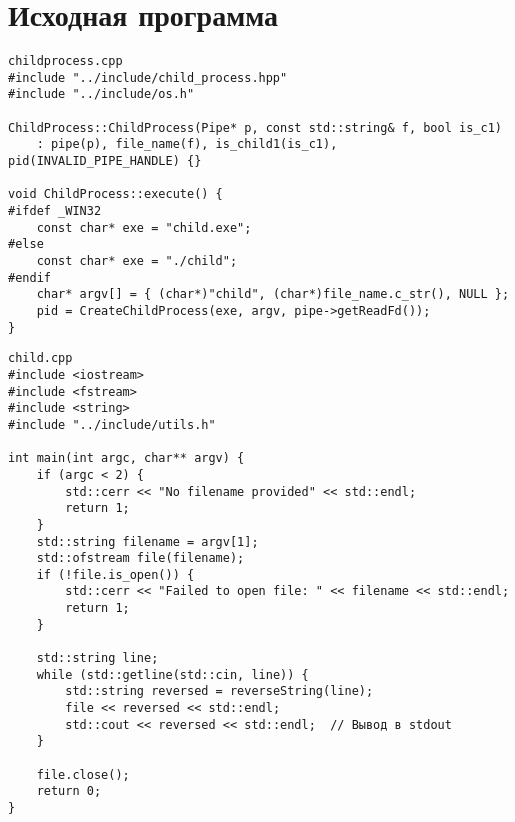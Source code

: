 \section{Исходная программа}

\begin{verbatim}
childprocess.cpp
#include "../include/child_process.hpp"
#include "../include/os.h"

ChildProcess::ChildProcess(Pipe* p, const std::string& f, bool is_c1) 
    : pipe(p), file_name(f), is_child1(is_c1), pid(INVALID_PIPE_HANDLE) {}

void ChildProcess::execute() {
#ifdef _WIN32
    const char* exe = "child.exe";
#else
    const char* exe = "./child";
#endif
    char* argv[] = { (char*)"child", (char*)file_name.c_str(), NULL };
    pid = CreateChildProcess(exe, argv, pipe->getReadFd());
}
\end{verbatim}

\begin{verbatim}
child.cpp
#include <iostream>
#include <fstream>
#include <string>
#include "../include/utils.h"

int main(int argc, char** argv) {
    if (argc < 2) {
        std::cerr << "No filename provided" << std::endl;
        return 1;
    }
    std::string filename = argv[1];
    std::ofstream file(filename);
    if (!file.is_open()) {
        std::cerr << "Failed to open file: " << filename << std::endl;
        return 1;
    }

    std::string line;
    while (std::getline(std::cin, line)) {
        std::string reversed = reverseString(line);
        file << reversed << std::endl;
        std::cout << reversed << std::endl;  // Вывод в stdout
    }

    file.close();
    return 0;
}
\end{verbatim}

